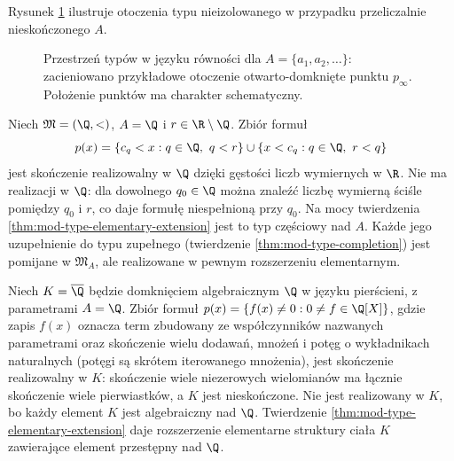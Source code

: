 Rysunek \ref{fig:mod-equality-stone} ilustruje otoczenia
typu nieizolowanego w przypadku przeliczalnie nieskończonego $A$.

\begin{figure}[htbp]
\centering
{}
\caption{Przestrzeń typów w języku równości dla
$A=\{a_1,a_2,\ldots\}$: zacieniowano przykładowe
otoczenie otwarto-domknięte punktu $p_\infty$.
Położenie punktów ma charakter schematyczny.}
\label{fig:mod-equality-stone}
\end{figure}

\begin{przyklad}
\label{ex:mod-type-cut}
Niech $\mathfrak M=(\Q,<)$, $A=\Q$ i $r\in\R\setminus\Q$.
Zbiór formuł
\[
p(x)=\{c_q<x:q\in\Q,\ q<r\}
\cup\{x<c_q:q\in\Q,\ r<q\}
\]
jest skończenie realizowalny w $\Q$ dzięki gęstości liczb
wymiernych w $\R$. Nie ma realizacji w $\Q$: dla dowolnego
$q_0\in\Q$ można znaleźć liczbę wymierną ściśle pomiędzy
$q_0$ i $r$, co daje formułę niespełnioną przy $q_0$.
Na mocy twierdzenia \ref{thm:mod-type-elementary-extension}
jest to typ częściowy nad $A$. Każde jego uzupełnienie
do typu zupełnego (twierdzenie \ref{thm:mod-type-completion}) jest
pomijane w $\mathfrak M_A$, ale realizowane w pewnym
rozszerzeniu elementarnym.
\end{przyklad}

\begin{przyklad}
\label{ex:mod-type-transcendental}
Niech $K=\overline{\Q}$ będzie domknięciem algebraicznym
$\Q$ w języku pierścieni, z parametrami $A=\Q$.
Zbiór formuł $p(x)=\{f(x)\ne0:0\ne f\in\Q[X]\}$,
gdzie zapis $f(x)$ oznacza term zbudowany ze współczynników
nazwanych parametrami oraz skończenie wielu dodawań,
mnożeń i potęg o wykładnikach naturalnych (potęgi są
skrótem iterowanego mnożenia),
jest skończenie realizowalny w $K$: skończenie wiele
niezerowych wielomianów ma łącznie skończenie wiele pierwiastków,
a $K$ jest nieskończone. Nie jest realizowany w $K$, bo
każdy element $K$ jest algebraiczny nad $\Q$.
Twierdzenie \ref{thm:mod-type-elementary-extension} daje
rozszerzenie elementarne struktury ciała $K$ zawierające element przestępny
nad $\Q$.
\end{przyklad}

